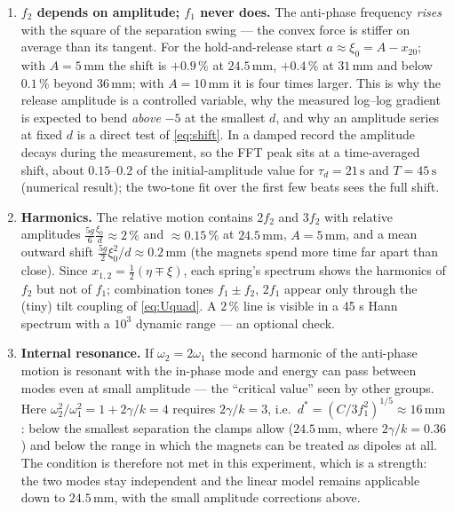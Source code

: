 \documentclass[11pt,a4paper]{article}
\newcommand{\un}[1]{\,\mathrm{#1}}
\begin{document}
\begin{enumerate}[leftmargin=1.8em,itemsep=2pt]
\item \textbf{$f_2$ depends on amplitude; $f_1$ never does.} The anti-phase frequency \emph{rises} with the square of the separation swing --- the convex force is stiffer on average than its tangent. For the hold-and-release start $a\approx\xi_0=A-x_{20}$; with $A=5\un{mm}$ the shift is $+0.9\,\%$ at $24.5\un{mm}$, $+0.4\,\%$ at $31\un{mm}$ and below $0.1\,\%$ beyond $36\un{mm}$; with $A=10\un{mm}$ it is four times larger. This is why the release amplitude is a controlled variable, why the measured log--log gradient is expected to bend \emph{above} $-5$ at the smallest $d$, and why an amplitude series at fixed $d$ is a direct test of \eqref{eq:shift}. In a damped record the amplitude decays during the measurement, so the FFT peak sits at a time-averaged shift, about $0.15$--$0.2$ of the initial-amplitude value for $\tau_d=21\un{s}$ and $T=45\un{s}$ (numerical result); the two-tone fit over the first few beats sees the full shift.
\item \textbf{Harmonics.} The relative motion contains $2f_2$ and $3f_2$ with relative amplitudes $\frac{5g}{6}\frac{\xi_0}{d}\approx2\,\%$ and $\approx0.15\,\%$ at $24.5\un{mm}$, $A=5\un{mm}$, and a mean outward shift $\frac{5g}{2}\xi_0^2/d\approx0.2\un{mm}$ (the magnets spend more time far apart than close). Since $x_{1,2}=\tfrac12(\eta\mp\xi)$, each spring's spectrum shows the harmonics of $f_2$ but not of $f_1$; combination tones $f_1\pm f_2$, $2f_1$ appear only through the (tiny) tilt coupling of \eqref{eq:Uquad}. A $2\,\%$ line is visible in a 45 s Hann spectrum with a $10^{3}$ dynamic range --- an optional check.
\item \textbf{Internal resonance.} If $\omega_2=2\omega_1$ the second harmonic of the anti-phase motion is resonant with the in-phase mode and energy can pass between modes even at small amplitude --- the ``critical value'' seen by other groups. Here $\omega_2^2/\omega_1^2=1+2\gamma/k=4$ requires $2\gamma/k=3$, i.e.\ $d^*=(C/3f_1^2)^{1/5}\approx16\un{mm}$: below the smallest separation the clamps allow ($24.5\un{mm}$, where $2\gamma/k=0.36$) and below the range in which the magnets can be treated as dipoles at all. The condition is therefore not met in this experiment, which is a strength: the two modes stay independent and the linear model remains applicable down to $24.5\un{mm}$, with the small amplitude corrections above.
\end{enumerate}
\end{document}
